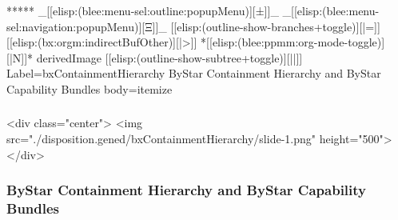 \begin{whenOrg}
\begin{whenOrg}
*****  _[[elisp:(blee:menu-sel:outline:popupMenu)][±]]_ _[[elisp:(blee:menu-sel:navigation:popupMenu)][Ξ]]_ [[elisp:(outline-show-branches+toggle)][|=]] [[elisp:(bx:orgm:indirectBufOther)][|>]] *[[elisp:(blee:ppmm:org-mode-toggle)][|N]]*  derivedImage [[elisp:(outline-show-subtree+toggle)][||]] Label=bxContainmentHierarchy ByStar Containment Hierarchy and ByStar Capability Bundles body=itemize
\end{whenOrg}

\begin{htmlonly}

\begin{frame}[fragile,plain,label=bxContainmentHierarchy]
    \frametitle{}
    \framesubtitle{}
    \begin{rawhtml}
<div class="center">
<img src="./disposition.gened/bxContainmentHierarchy/slide-1.png" height="500">
</div>
    \end{rawhtml}
\end{frame}
\end{htmlonly}

\begin{verblatex}

\begin{frame}[fragile,plain,label=bxContainmentHierarchy]
    \frametitle{ByStar Containment Hierarchy and ByStar Capability Bundles}
    \framesubtitle{}

\begin{presentationMode}


\end{presentationMode}
\end{frame}
\end{verblatex}
\end{whenOrg}
